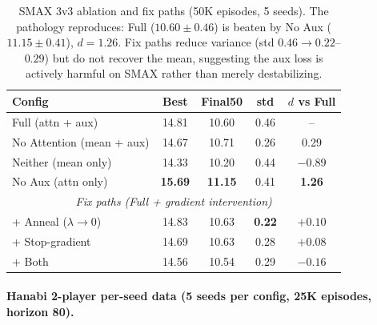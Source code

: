 \documentclass{article}
\theoremstyle{plain}
\theoremstyle{definition}
\theoremstyle{remark}
\begin{document}
\begin{table}[H]
\centering
\small
\begin{tabular}{lcccc}
\toprule
Config & Best & Final50 & std & $d$ vs Full \\
\midrule
Full (attn + aux) & 14.81 & 10.60 & 0.46 & -- \\
No Attention (mean + aux) & 14.67 & 10.71 & 0.26 & 0.29 \\
Neither (mean only) & 14.33 & 10.20 & 0.44 & $-0.89$ \\
No Aux (attn only) & \textbf{15.69} & \textbf{11.15} & 0.41 & \textbf{1.26} \\
\midrule
\multicolumn{5}{c}{\textit{Fix paths (Full + gradient intervention)}} \\
\midrule
+ Anneal ($\lambda \to 0$) & 14.83 & 10.63 & \textbf{0.22} & $+0.10$ \\
+ Stop-gradient & 14.69 & 10.63 & 0.28 & $+0.08$ \\
+ Both & 14.56 & 10.54 & 0.29 & $-0.16$ \\
\bottomrule
\end{tabular}
\caption{SMAX 3v3 ablation and fix paths (50K episodes, 5 seeds). The pathology
reproduces: Full ($10.60 \pm 0.46$) is beaten by No Aux ($11.15 \pm 0.41$),
$d = 1.26$. Fix paths reduce variance (std $0.46 \to 0.22$--$0.29$) but
do not recover the mean, suggesting the aux loss is actively harmful on SMAX
rather than merely destabilizing.}
\end{table}

\paragraph{Hanabi 2-player per-seed data (5 seeds per config, 25K episodes, horizon 80).}
\end{document}
